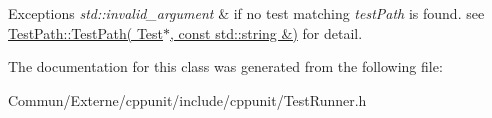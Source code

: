 \begin{DoxyExceptions}{Exceptions}
{\em std\+::invalid\+\_\+argument} & if no test matching {\itshape test\+Path} is found. see \hyperlink{class_test_path_a5855701e39a328a19f9780a130106cb3}{Test\+Path\+::\+Test\+Path( Test$\ast$, const std\+::string \&)} for detail. \\
\hline
\end{DoxyExceptions}


The documentation for this class was generated from the following file\+:\begin{DoxyCompactItemize}
\item 
Commun/\+Externe/cppunit/include/cppunit/Test\+Runner.\+h\end{DoxyCompactItemize}
